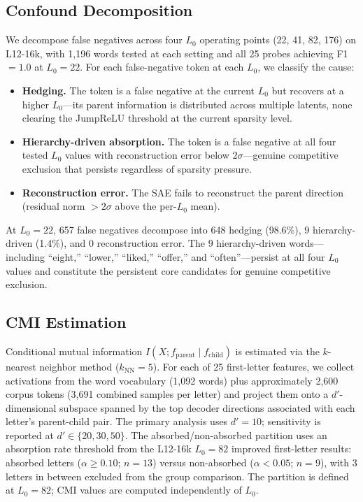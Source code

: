\documentclass{article}
\begin{document}
\subsection{Confound Decomposition}
\label{sec:confound}

We decompose false negatives across four $L_0$ operating points (22, 41, 82, 176) on L12-16k, with 1,196 words tested at each setting and all 25 probes achieving F1 $= 1.0$ at $L_0{=}22$. For each false-negative token at each $L_0$, we classify the cause:

\begin{itemize}
\item \textbf{Hedging.} The token is a false negative at the current $L_0$ but recovers at a higher $L_0$---its parent information is distributed across multiple latents, none clearing the JumpReLU threshold at the current sparsity level.

\item \textbf{Hierarchy-driven absorption.} The token is a false negative at all four tested $L_0$ values with reconstruction error below $2\sigma$---genuine competitive exclusion that persists regardless of sparsity pressure.

\item \textbf{Reconstruction error.} The SAE fails to reconstruct the parent direction (residual norm $> 2\sigma$ above the per-$L_0$ mean).
\end{itemize}

At $L_0{=}22$, 657 false negatives decompose into 648 hedging (98.6\%), 9 hierarchy-driven (1.4\%), and 0 reconstruction error. The 9 hierarchy-driven words---including ``eight,'' ``lower,'' ``liked,'' ``offer,'' and ``often''---persist at all four $L_0$ values and constitute the persistent core candidates for genuine competitive exclusion.

\subsection{CMI Estimation}

Conditional mutual information $I(X; f_{\text{parent}} \mid f_{\text{child}})$ is estimated via the $k$-nearest neighbor method \citep{kraskov2004estimating} ($k_{\text{NN}} = 5$). For each of 25 first-letter features, we collect activations from the word vocabulary (1,092 words) plus approximately 2,600 corpus tokens (3,691 combined samples per letter) and project them onto a $d'$-dimensional subspace spanned by the top decoder directions associated with each letter's parent-child pair. The primary analysis uses $d' = 10$; sensitivity is reported at $d' \in \{20, 30, 50\}$. The absorbed/non-absorbed partition uses an absorption rate threshold from the L12-16k $L_0{=}82$ improved first-letter results: absorbed letters ($\alpha \geq 0.10$; $n = 13$) versus non-absorbed ($\alpha < 0.05$; $n = 9$), with 3 letters in between excluded from the group comparison. The partition is defined at $L_0{=}82$; CMI values are computed independently of $L_0$.
\end{document}
